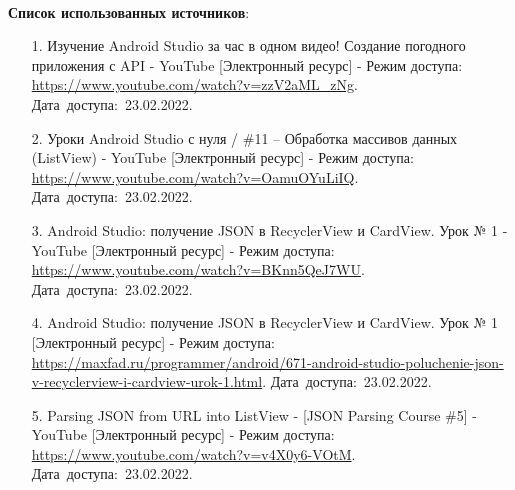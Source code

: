 \documentclass[12pt, a4paper, simple]{eskdtext}
\begin{document}
    \paragraph{} \textbf{Список использованных источников}:
    \begin{enumerate}
        \item[1.] Изучение Android Studio за час в одном видео! Создание погодного приложения с API - YouTube  [Электронный ресурс]
        - Режим доступа: \url{https://www.youtube.com/watch?v=zzV2aML_zNg}.
        Дата~доступа:~23.02.2022.

        \item[2.] Уроки Android Studio с нуля / \#11 – Обработка массивов данных (ListView) - YouTube  [Электронный ресурс]
        - Режим доступа: \url{https://www.youtube.com/watch?v=OamuOYuLiIQ}.
        Дата~доступа:~23.02.2022.

        \item[3.] Android Studio: получение JSON в RecyclerView и CardView. Урок № 1 - YouTube  [Электронный ресурс]
        - Режим доступа: \url{https://www.youtube.com/watch?v=BKnn5QeJ7WU}.
        Дата~доступа:~23.02.2022.

        \item[4.] Android Studio: получение JSON в RecyclerView и CardView. Урок № 1  [Электронный ресурс]
        - Режим доступа: \url{https://maxfad.ru/programmer/android/671-android-studio-poluchenie-json-v-recyclerview-i-cardview-urok-1.html}.
        Дата~доступа:~23.02.2022.

        \item[5.] Parsing JSON from URL into ListView - [JSON Parsing Course \#5] - YouTube  [Электронный ресурс]
        - Режим доступа: \url{https://www.youtube.com/watch?v=v4X0y6-VOtM}.
        Дата~доступа:~23.02.2022.
    \end{enumerate}
    \newpage
\end{document}
